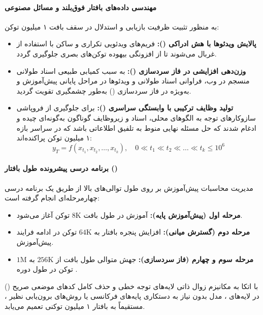 \paragraph*{مهندسی داده‌های بافتار فوق‌بلند و مسائل مصنوعی}
به منظور تثبیت ظرفیت بازیابی و استدلال در سقف بافت ۱ میلیون توکن:
\begin{itemize}
    \item \textbf{پالایش ویدئوها با هش ادراکی ():} فریم‌های ویدئویی تکراری و ساکن با استفاده از  غربال می‌شوند تا از افزونگی بیهوده توکن‌های بصری جلوگیری گردد.
    \item \textbf{وزن‌دهی افزایشی در فاز سردسازی ():} به سبب کمیابی طبیعی اسناد طولانی منسجم در وب، فراوانی اسناد طولانی و ویدئوها در مراحل پایانی پیش‌آموزش و به‌ویژه در فاز سردسازی () به‌طور چشمگیری تقویت گردید.
    \item \textbf{تولید وظایف ترکیبی با وابستگی سراسری ():} برای جلوگیری از فروپاشی سازوکارهای توجه به الگوهای محلی، اسناد و زیروظایف گوناگون به‌گونه‌ای چیده و ادغام شدند که حل مسئله نهایی منوط به تلفیق اطلاعاتی باشد که در سراسر بازه ۱ میلیون توکن پراکنده‌اند:
    \begin{equation}
        y_T = f(x_{t_1}, x_{t_2}, \dots, x_{t_k}), \quad 0 \ll t_1 \ll t_2 \ll \dots \ll t_k \le 10^6
    \end{equation}
\end{itemize}

\paragraph*{برنامه درسی پیشرونده طول بافتار ()}
مدیریت محاسبات پیش‌آموزش بر روی طول توالی‌های بالا از طریق یک برنامه درسی چهارمرحله‌ای انجام گرفته است:
\begin{itemize}
    \item \textbf{مرحله اول (پیش‌آموزش پایه):} آموزش در طول بافت $8\text{K}$ توکن آغاز می‌شود.
    \item \textbf{مرحله دوم (گسترش میانی):} افزایش پنجره بافتار به $64\text{K}$ توکن در ادامه فرایند پیش‌آموزش.
    \item \textbf{مرحله سوم و چهارم (فاز سردسازی):} جهش متوالی طول بافت از $256\text{K}$ به $1\text{M}$ توکن در طول دوره .
\end{itemize}
با اتکا به مکانیزم زوال ذاتی لایه‌های توجه خطی  \cite{kimi2025linear} و حذف کامل کدهای موضعی صریح () در لایه‌های ، مدل بدون نیاز به دستکاری پایه‌های فرکانسی  یا روش‌های برون‌یابی نظیر  \cite{peng2023yarn}، مستقیماً به بافتار ۱ میلیون توکنی تعمیم می‌یابد.

